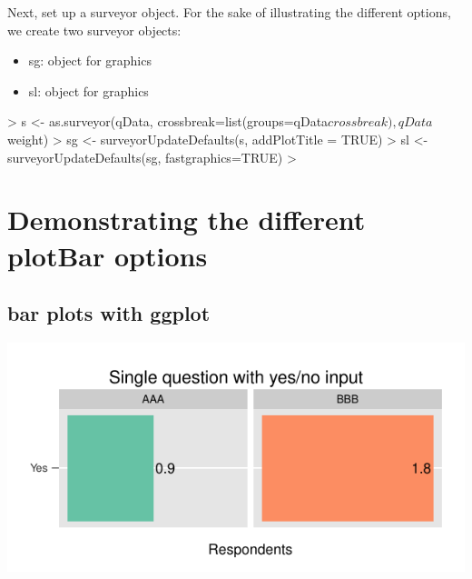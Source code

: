 \documentclass[10pt,oneside]{article}
\begin{document}
Next, set up a surveyor object.  For the sake of illustrating the different options, we create two surveyor objects:
\begin{itemize}
\item sg: \surveyor{} object for \ggplot{} graphics
\item sl: \surveyor{} object for  graphics
\end{itemize}

\begin{Schunk}
\begin{Sinput}
> s <- as.surveyor(qData, crossbreak=list(groups=qData$crossbreak), qData$weight)
> sg <- surveyorUpdateDefaults(s, addPlotTitle = TRUE)
> sl <- surveyorUpdateDefaults(sg, fastgraphics=TRUE)
> 
\end{Sinput}
\end{Schunk}


\section{Demonstrating the different plotBar options}


\subsection{bar plots with ggplot}


\begin{Schunk}
\end{Schunk}
\includegraphics{graphics/figure-003}
\end{document}
